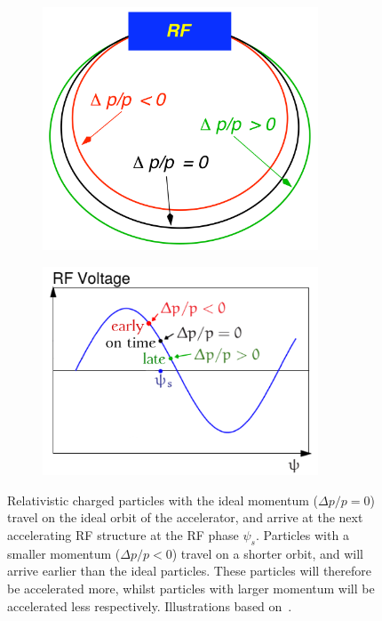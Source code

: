 \begin{figure}
\begin{subfigure}[b]{0.4\textwidth}
\centering
 \includegraphics[width=0.9\textwidth]{Figures/PhaseFocusing.png}
\end{subfigure}\hfill
\begin{subfigure}[b]{0.49\textwidth}
\centering
 \includegraphics[width=0.9\textwidth]{Figures/RFphase.png}
\end{subfigure}
\caption[Phase focusing]{Relativistic charged particles with the ideal momentum ($\Delta p/p = 0$) travel on the ideal orbit of the accelerator, and arrive at the next accelerating RF structure at the RF phase $\psi_s$. 
Particles with a smaller momentum ($\Delta p/p < 0$) travel on a shorter orbit, and will arrive earlier than the ideal particles.
These particles will therefore be accelerated more, whilst particles with larger momentum will be accelerated less respectively.
Illustrations based on~\cite{Anke}.}
\label{fig:RFPhase}
\end{figure}
